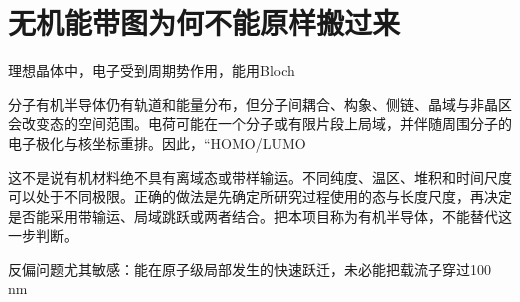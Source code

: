 \documentclass[11pt,a4paper]{article}
\begin{document}
\section{{\cjkfont 无机能带图为何不能原样搬过来}\allowbreak{}}\label{sec:3}
{\cjkfont 理想晶体中，电子受到周期势作用，能用}\allowbreak{}Bloch\allowbreak{}
\par
{\cjkfont 分子有机半导体仍有轨道和能量分布，但分子间耦合、构象、侧链、晶域与非晶区会改变态的空间范围。电荷可能在一个分子或有限片段上局域，并伴随周围分子的电子极化与核坐标重排。因此，“}\nobreak{}HOMO/LUMO\allowbreak{}
\par
{\cjkfont 这不是说有机材料绝不具有离域态或带样输运。不同纯度、温区、堆积和时间尺度可以处于不同极限。正确的做法是先确定所研究过程使用的态与长度尺度，再决定是否能采用带输运、局域跳跃或两者结合。把本项目称为有机半导体，不能替代这一步判断。}\allowbreak{}
\par
{\cjkfont 反偏问题尤其敏感：能在原子级局部发生的快速跃迁，未必能把载流子穿过}\allowbreak{}100 nm\allowbreak{}
\par
\end{document}
